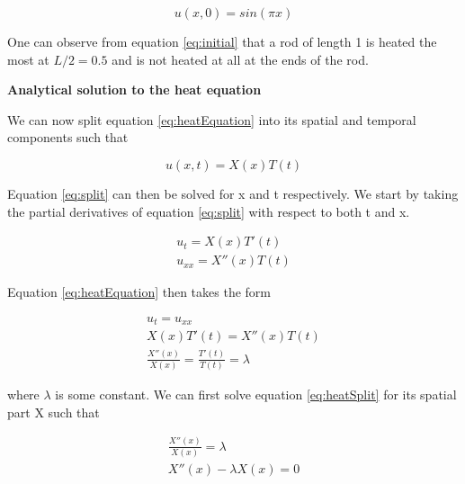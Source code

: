 \documentclass[12pt,a4paper]{article}
\begin{document}
\begin{equation}\label{eq:initial}
u(x,0) = sin(\pi x)
\end{equation}

\noindent One can observe from equation \ref{eq:initial} that a rod of length 1 is heated the most at $L/2 = 0.5$ and is not heated at all at the ends of the rod. 

\begin{center}
\large{\textbf{Analytical solution to the heat equation}}
\end{center}

\noindent We can now split equation \ref{eq:heatEquation} into its spatial and temporal components such that 

\begin{equation}\label{eq:split}
u(x,t) = X(x)T(t)
\end{equation}

\noindent Equation \ref{eq:split} can then be solved for x and t respectively. We start by taking the partial derivatives of equation \ref{eq:split} with respect to both t and x.

\begin{equation}\label{eq:split2}
\begin{aligned}
u_t = X(x)T'(t)
\\
u_{xx} = X''(x)T(t)
\end{aligned}
\end{equation}

\noindent Equation \ref{eq:heatEquation} then takes the form

\begin{equation}\label{eq:heatSplit}
\begin{aligned}
u_t = u_{xx}
\\
X(x)T'(t) = X''(x)T(t)
\\
\frac{X''(x)}{X(x)} = \frac{T'(t)}{T(t)} = \lambda
\end{aligned}
\end{equation}

\noindent where $\lambda$ is some constant. We can first solve equation \ref{eq:heatSplit} for its spatial part X such that

\begin{equation}\label{eq:solveX}
\begin{aligned}
\frac{X''(x)}{X(x)} = \lambda
\\
X''(x) - \lambda X(x) = 0
\end{aligned}
\end{equation}
\end{document}
